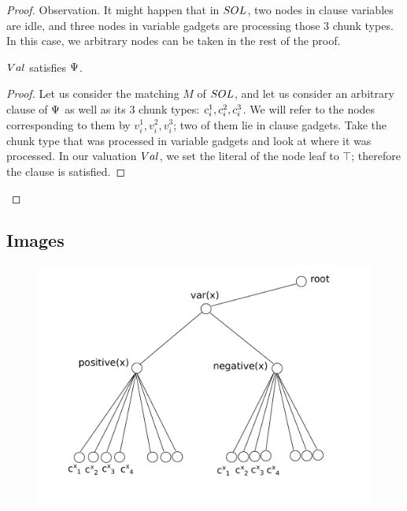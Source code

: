 \begin{proof}
Observation. It might happen that in $SOL$, two nodes in
clause variables are idle, and three nodes in variable gadgets are
processing those $3$ chunk types. In this case, we 
arbitrary nodes can be taken in the rest
of the proof.

\begin{lemma}
$Val$ satisfies $\Psi$.
\end{lemma}
\begin{proof}
Let us consider the matching $M$ of $SOL$, and let us consider an arbitrary clause of
$\Psi$ as well as its $3$ chunk types: $c_i^1, c_i^2, c_i^3$. 
We will refer to the nodes corresponding to them
by $v_i^1, v_i^2, v_i^3$; two of them lie in clause gadgets. 
Take the chunk type that was processed in variable
gadgets and look at where it was processed. 
In our valuation $Val$, we set the literal of the node leaf to
$\top$; therefore the clause is satisfied.
\end{proof}
\end{proof}

\subsection{Images}

\begin{figure}[htbp]
\includegraphics[width = \columnwidth]{figs/gadget-no-bw}
\end{figure}


